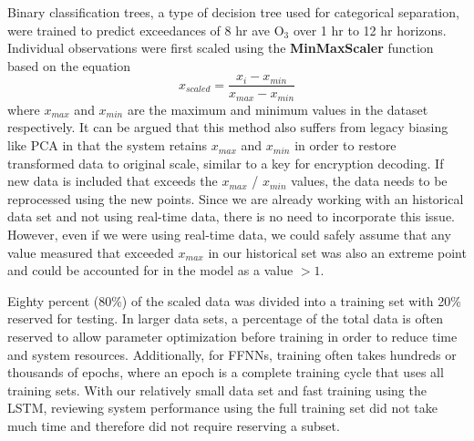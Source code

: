 Binary classification trees, a type of decision tree used for categorical separation,  were trained to predict exceedances of 8 hr ave O$_{3}$ over 1 hr to 12 hr horizons. Individual observations were first scaled using the \textbf{MinMaxScaler} function based on the equation
%
\begin{equation}
\label{eq:MaxMin}
x_{scaled} = \frac{x_{i} - x_{min}}{x_{max} - x_{min}}
\end{equation}
%
\noindent
where $x_{max}$ and $x_{min}$ are the maximum and minimum values in the dataset respectively. It can be argued that this method also suffers from legacy biasing like PCA in that the system retains $x_{max}$ and $x_{min}$ in order to restore transformed data to original scale, similar to a key for encryption decoding. If new data is included that exceeds the $x_{max}$ / $x_{min}$ values, the data needs to be reprocessed using the new points. Since we are already working with an historical data set and not using real-time data, there is no need to incorporate this issue. However, even if we were using real-time data, we could safely assume that any value measured that exceeded $x_{max}$ in our historical set was also an extreme point and could be accounted for in the model as a value $>1$. 

Eighty percent (80\%) of the scaled data was divided into a training set with 20\% reserved for testing.  In larger data sets, a percentage of the total data is often reserved to allow parameter optimization before training in order to reduce time and system resources. Additionally, for FFNNs, training often takes hundreds or thousands of epochs, where an epoch is a complete training cycle that uses all training sets. With our relatively small data set and fast training using the LSTM, reviewing system performance using the full training set did not take much time and therefore did not require reserving a subset.

